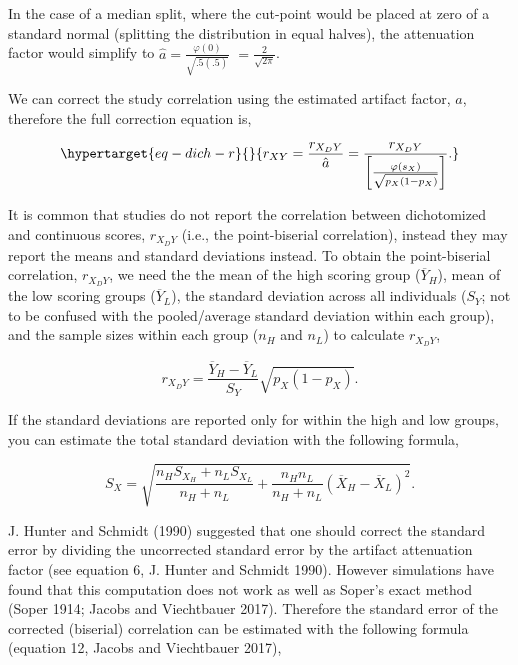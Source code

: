 \documentclass[
  letterpaper,
  DIV=11,
  numbers=noendperiod]{scrreprt}
\begin{document}
In the case of a median split, where the cut-point would be placed at
zero of a standard normal (splitting the distribution in equal halves),
the attenuation factor would simplify to
\(\hat{a} =\frac{\varphi(0)}{\sqrt{.5(.5)}}\)
\(=\frac{2}{\sqrt{2\pi}}\).

We can correct the study correlation using the estimated artifact
factor, \(\hat{a}\), therefore the full correction equation is,

\begin{equation}\protect\hypertarget{eq-dich-r}{}{
r_{XY} = \frac{r_{X_DY}}{\hat{a}} = \frac{r_{X_DY}}{\left[\frac{\varphi\left(s_X\right)}{\sqrt{p_X(1-p_X)}}\right]}.
}\label{eq-dich-r}\end{equation}

\begin{tcolorbox}[enhanced jigsaw, toptitle=1mm, titlerule=0mm, arc=.35mm, breakable, colframe=quarto-callout-tip-color-frame, title={Converting to \(\boldsymbol{\mathsf{r_{X_{D}Y}}}\) from means and
standard deviations}, opacitybacktitle=0.6, opacityback=0, colbacktitle=quarto-callout-tip-color!10!white, coltitle=black, bottomtitle=1mm, colback=white, bottomrule=.15mm, rightrule=.15mm, toprule=.15mm, leftrule=.75mm, left=2mm]

It is common that studies do not report the correlation between
dichotomized and continuous scores, \(r_{X_DY}\) (i.e., the
point-biserial correlation), instead they may report the means and
standard deviations instead. To obtain the point-biserial correlation,
\(r_{X_D Y}\), we need the the mean of the high scoring group
(\(\overline{Y}_H\)), mean of the low scoring groups
(\(\overline{Y}_L\)), the standard deviation across all individuals
(\(S_Y\); not to be confused with the pooled/average standard deviation
within each group), and the sample sizes within each group (\(n_H\) and
\(n_L\)) to calculate \(r_{X_DY}\),

\[
r_{X_D Y} =\frac{\overline{Y}_H-\overline{Y}_L}{S_Y} \sqrt{p_X(1-p_X)}.
\]

If the standard deviations are reported only for within the high and low
groups, you can estimate the total standard deviation with the following
formula,

\[
S_X = \sqrt{\frac{n_HS_{X_H} + n_L S_{X_L}}{n_H + n_L} +\frac{n_Hn_L}{n_H + n_L}(\overline{X}_H - \overline{X}_L)^2}.
\]

\end{tcolorbox}

J. Hunter and Schmidt (1990) suggested that one should correct the
standard error by dividing the uncorrected standard error by the
artifact attenuation factor (see equation 6, J. Hunter and Schmidt
1990). However simulations have found that this computation does not
work as well as Soper's exact method (Soper 1914; Jacobs and Viechtbauer
2017). Therefore the standard error of the corrected (biserial)
correlation can be estimated with the following formula (equation 12,
Jacobs and Viechtbauer 2017),
\end{document}
